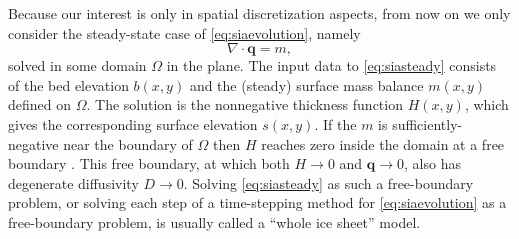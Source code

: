 \documentclass[11pt]{amsart}
\newcommand\bq{\mathbf{q}}
\newcommand{\Div}{\nabla\cdot}
\begin{document}
Because our interest is only in spatial discretization aspects, from now on we only consider the steady-state case of \eqref{eq:siaevolution}, namely
\begin{equation}
\Div \bq = m,  \label{eq:siasteady}
\end{equation}
solved in some domain $\Omega$ in the plane.  The input data to \eqref{eq:siasteady} consists of the bed elevation $b(x,y)$ and the (steady) surface mass balance $m(x,y)$ defined on $\Omega$.  The solution is the nonnegative thickness function $H(x,y)$, which gives the corresponding surface elevation $s(x,y)$.  If the $m$ is sufficiently-negative near the boundary of $\Omega$ then $H$ reaches zero inside the domain at a free boundary \cite{JouvetBueler2012}.  This free boundary, at which both $H\to 0$ and $\bq \to 0$, also has degenerate diffusivity $D \to 0$.  Solving \eqref{eq:siasteady} as such a free-boundary problem, or solving each step of a time-stepping method for \eqref{eq:siaevolution} as a free-boundary problem, is usually called a ``whole ice sheet'' model.
\end{document}

